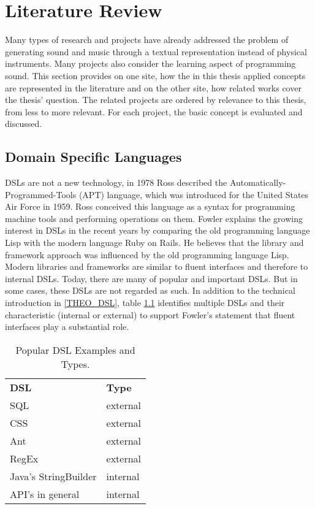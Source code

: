\chapter{Literature Review}
\label{LIT}
Many types of research and projects have already addressed the problem of generating sound and music through a textual representation instead of physical instruments. Many projects also consider the learning aspect of programming sound. This section provides on one site, how the in this thesis applied concepts are represented in the literature and on the other site, how related works cover the thesis' question. The related projects are ordered by relevance to this thesis, from less to more relevant. For each project, the basic concept is evaluated and discussed.

\section{Domain Specific Languages}
\label{LIT_DSL}
DSLs are not a new technology, in 1978 Ross described the Automatically-Programmed-Tools (APT) language, which was introduced for the United States Air Force in 1959.\cite{Ross1978} Ross conceived this language as a syntax for programming machine tools and performing operations on them. Fowler explains the growing interest in DSLs in the recent years by comparing the old programming language Lisp with the modern language Ruby on Rails.\cite{Fowler2010} He believes that the library and framework approach was influenced by the old programming language Lisp. Modern libraries and frameworks are similar to fluent interfaces and therefore to internal DSLs. Today, there are many of popular and important DSLs. But in some cases, these DSLs are not regarded as such. In addition to the technical introduction in \ref{THEO_DSL}, table \ref{TBL_DSLS} identifies multiple DSLs and their characteristic (internal or external) to support Fowler's statement that fluent interfaces play a substantial role.

\begin{table}[]
\caption{Popular DSL Examples and Types.}
\label{TBL_DSLS}
\begin{tabular}{p{150pt}|p{200pt}}
\rowcolor{htwg-teal} 
\textbf{DSL}                  			& \textbf{Type}     \\
SQL                  						& external \\
CSS                 						& external \\
Ant                  							& external \\
RegEx                						& external \\
Java's StringBuilder 				& internal \\
API's in general						& internal
\end{tabular}
\end{table}


